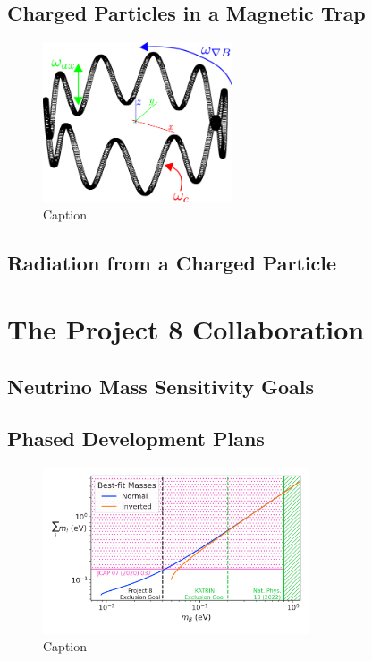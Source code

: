 \subsection{Charged Particles in a Magnetic Trap}

\begin{figure}[htbp]
    \centering
    \includegraphics[width=0.5\textwidth]{figs/Chapter-3/230511_trapped_motion.png}
    \caption{Caption}
    \label{fig:chap3-trapped-electron-motion}
\end{figure}

\subsection{Radiation from a Charged Particle}

\section{The Project 8 Collaboration}

\subsection{Neutrino Mass Sensitivity Goals}

\subsection{Phased Development Plans}

\begin{figure}[htbp]
    \centering
    \includegraphics[width=0.7\textwidth]{figs/Chapter-3/230303_sum_nu_mass_vs_m_beta_with_exclusion_and_goal.png}
    \caption{Caption}
    \label{fig:p8_nu_mass_goal}
\end{figure}

